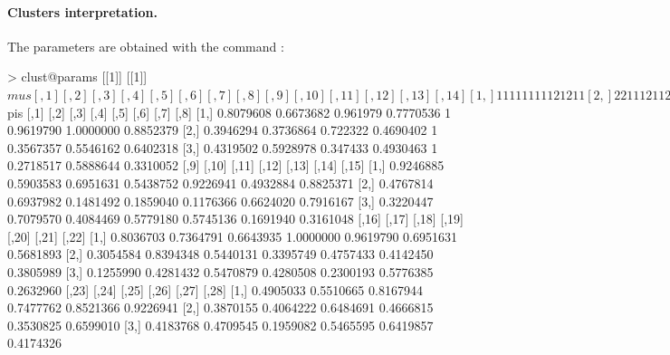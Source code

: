 \paragraph{Clusters interpretation.}
The parameters are obtained with the command :
\begin{example}
> clust@params
[[1]]
[[1]]$mus
     [,1] [,2] [,3] [,4] [,5] [,6] [,7] [,8] [,9] [,10] [,11] [,12] [,13] [,14]
[1,]    1    1    1    1    1    1    1    1    1     2     1     2     1     1
[2,]    2    2    1    1    1    2    1    1    2     2     1     3     2     1
[3,]    3    4    3    3    1    4    3    2    3     4     2     4     3     4
     [,15] [,16] [,17] [,18] [,19] [,20] [,21] [,22] [,23] [,24] [,25] [,26]
[1,]     1     1     1     2     1     1     1     2     1     1     1     1
[2,]     1     1     1     2     2     1     2     2     1     2     1     1
[3,]     1     1     1     4     3     3     3     3     2     2     2     3
     [,27] [,28]
[1,]     1     1
[2,]     1     1
[3,]     4     1

[[1]]$pis
          [,1]      [,2]     [,3]      [,4] [,5]      [,6]      [,7]      [,8]
[1,] 0.8079608 0.6673682 0.961979 0.7770536    1 0.9619790 1.0000000 0.8852379
[2,] 0.3946294 0.3736864 0.722322 0.4690402    1 0.3567357 0.5546162 0.6402318
[3,] 0.4319502 0.5928978 0.347433 0.4930463    1 0.2718517 0.5888644 0.3310052
          [,9]     [,10]     [,11]     [,12]     [,13]     [,14]     [,15]
[1,] 0.9246885 0.5903583 0.6951631 0.5438752 0.9226941 0.4932884 0.8825371
[2,] 0.4767814 0.6937982 0.1481492 0.1859040 0.1176366 0.6624020 0.7916167
[3,] 0.3220447 0.7079570 0.4084469 0.5779180 0.5745136 0.1691940 0.3161048
         [,16]     [,17]     [,18]     [,19]     [,20]     [,21]     [,22]
[1,] 0.8036703 0.7364791 0.6643935 1.0000000 0.9619790 0.6951631 0.5681893
[2,] 0.3054584 0.8394348 0.5440131 0.3395749 0.4757433 0.4142450 0.3805989
[3,] 0.1255990 0.4281432 0.5470879 0.4280508 0.2300193 0.5776385 0.2632960
         [,23]     [,24]     [,25]     [,26]     [,27]     [,28]
[1,] 0.4905033 0.5510665 0.8167944 0.7477762 0.8521366 0.9226941
[2,] 0.3870155 0.4064222 0.6484691 0.4666815 0.3530825 0.6599010
[3,] 0.4183768 0.4709545 0.1959082 0.5465595 0.6419857 0.4174326
\end{example}

